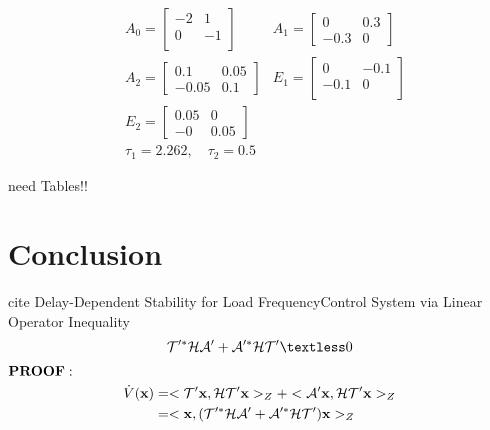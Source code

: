 \documentclass[twocolumn]{autart}    %
\begin{document}
\begin{equation}
    \begin{aligned}
        &A_{0} =  \begin{bmatrix}
            -2 & 1\\
            0 & -1\\
        \end{bmatrix}
        &A_{1} =  \begin{bmatrix}
            0 & 0.3\\
            -0.3 & 0
        \end{bmatrix}\\
        &A_{2} =  \begin{bmatrix}
            0.1 & 0.05\\
            -0.05 & 0.1
        \end{bmatrix}
        &E_{1} =  \begin{bmatrix}
            0 & -0.1\\
            -0.1 & 0\\
        \end{bmatrix}\\
        &E_{2} =  \begin{bmatrix}
            0.05 & 0\\
            -0 & 0.05
        \end{bmatrix}\\
        &\tau_{1} =  2.262, \quad \tau_{2} =  0.5
    \end{aligned}
\end{equation}



need Tables!!



\section{Conclusion}
cite Delay-Dependent Stability for Load FrequencyControl System via Linear Operator Inequality 
\begin{equation}
    \begin{aligned}
        \setlength{\arraycolsep}{0.9pt}
        \mathcal{T}'^{*}\mathcal{H}\mathcal{A}'+\mathcal{A}'^{*}\mathcal{H}\mathcal{T}' \textless 0
    \end{aligned}
\end{equation}
$\bold{PROOF:}$ 
\begin{equation}
    \begin{aligned}
        \setlength{\arraycolsep}{0.9pt}
        \dot{V}(\bold{x}) &= <\mathcal{T}'\bold{x},\mathcal{H}\mathcal{T}'\bold{x}>_{Z} + <\mathcal{A}'\bold{x},\mathcal{H}\mathcal{T}'\bold{x}>_{Z} \\ &=<\bold{x},(\mathcal{T}'^{*}\mathcal{H}\mathcal{A}'+\mathcal{A}'^{*}\mathcal{H}\mathcal{T}')\bold{x}>_{Z}  
    \end{aligned}
\end{equation}
\end{document}
